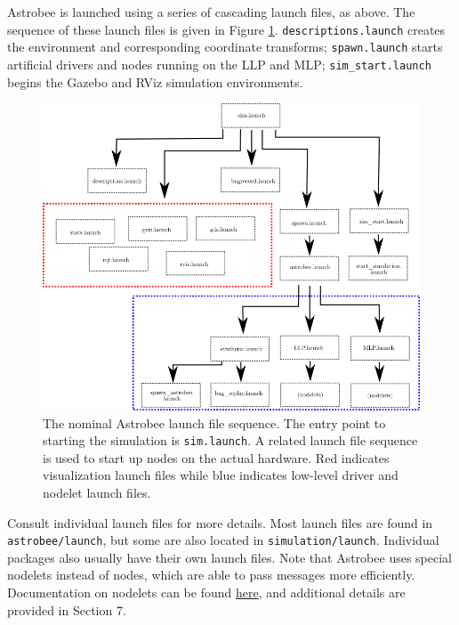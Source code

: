 \documentclass{article}
\begin{document}
Astrobee is launched using a series of cascading launch files, as above. The sequence of these launch files is given in Figure \ref{fig:launchfiles}. \texttt{descriptions.launch} creates the environment and corresponding coordinate transforms; \texttt{spawn.launch} starts artificial drivers and nodes running on the LLP and MLP; \texttt{sim\_start.launch} begins the Gazebo and RViz simulation environments. 

\begin{figure}[h!]
    \begin{adjustwidth}{-1in}{-1in}
    \centering
    \includegraphics[width=1.4\textwidth]{img/launch_diag.png}
    \caption{The nominal Astrobee launch file sequence. The entry point to starting the simulation is \texttt{sim.launch}. A related launch file sequence is used to start up nodes on the actual hardware. Red indicates visualization launch files while blue indicates low-level driver and nodelet launch files.}
    \label{fig:launchfiles}
    \end{adjustwidth}
\end{figure}

Consult individual launch files for more details. Most launch files are found in \texttt{astrobee/launch}, but some are also located in \texttt{simulation/launch}. Individual packages also usually have their own launch files. Note that Astrobee uses special nodelets instead of nodes, which are able to pass messages more efficiently. Documentation on nodelets can be found \href{http://wiki.ros.org/nodelet}{here}, and additional details are provided in Section 7.
\end{document}

